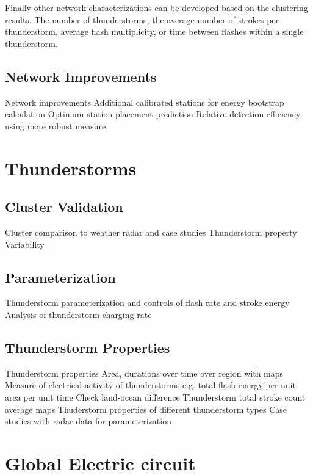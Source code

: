 Finally other network characterizations can be developed based on the clustering results.
The number of thunderstorms, the average number of strokes per thunderstorm, average flash multiplicity, or time between flashes within a single thunderstorm.

\subsection{Network Improvements}

Network improvements
  Additional calibrated stations for energy bootstrap calculation
  Optimum station placement prediction
  Relative detection efficiency using more robust measure

\section{Thunderstorms}

\subsection{Cluster Validation}

Cluster comparison to weather radar and case studies
  Thunderstorm property Variability

\subsection{Parameterization}

  Thunderstorm parameterization and controls of flash rate and stroke energy
  Analysis of thunderstorm charging rate

\subsection{Thunderstorm Properties}

 Thunderstorm properties
  Area, durations over time over region with maps
  Measure of electrical activity of thunderstorms
     e.g. total flash energy per unit area per unit time
     Check land-ocean difference
  Thunderstorm total stroke count average maps
  Thuderstorm properties of different thunderstorm types
  Case studies with radar data for parameterization

\section{Global Electric circuit}

